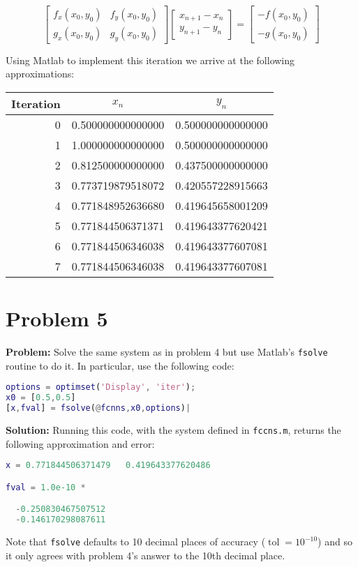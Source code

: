 \documentclass{article}
\begin{document}
$$\begin{bmatrix}
    f_x(x_0,y_0) & f_y(x_0,y_0)\\
    g_x(x_0,y_0) & g_y(x_0,y_0)
\end{bmatrix}
\begin{bmatrix}
    x_{n+1}-x_n\\
    y_{n+1}-y_n
\end{bmatrix}=
\begin{bmatrix}
    -f(x_0,y_0)\\
    -g(x_0,y_0)
\end{bmatrix}$$

Using Matlab to implement this iteration we arrive at the following approximations:
\begin{center}
\begin{tabular}{r|c|c}
      Iteration & $x_n$ & $y_n$\\
      \hline
      0 & 0.500000000000000 & 0.500000000000000\\
      1 & 1.000000000000000 & 0.500000000000000\\
      2 & 0.812500000000000 & 0.437500000000000\\
      3 & 0.773719879518072 & 0.420557228915663\\
      4 & 0.771848952636680 & 0.419645658001209\\
      5 & 0.771844506371371 & 0.419643377620421\\
      6 & 0.771844506346038 & 0.419643377607081\\
      7 & 0.771844506346038 & 0.419643377607081
\end{tabular}
\end{center}


\section*{Problem 5}
\textbf{Problem:} Solve the same system as in problem 4 but use Matlab's \verb|fsolve| routine to do it. In particular, use the following code:

\begin{lstlisting}[language=Matlab]
options = optimset('Display', 'iter');
x0 = [0.5,0.5]
[x,fval] = fsolve(@fcnns,x0,options)|
\end{lstlisting}
\textbf{Solution:}
Running this code, with the system defined in \verb|fccns.m|, returns the following approximation and error:

\begin{lstlisting}[language=Matlab]
x = 0.771844506371479   0.419643377620486

fval = 1.0e-10 *

  -0.250830467507512
  -0.146170298087611
\end{lstlisting}

Note that \verb|fsolve| defaults to 10 decimal places of accuracy ($\operatorname{tol}=10^{-10}$) and so it only agrees with problem 4's answer to the 10th decimal place.
\end{document}

